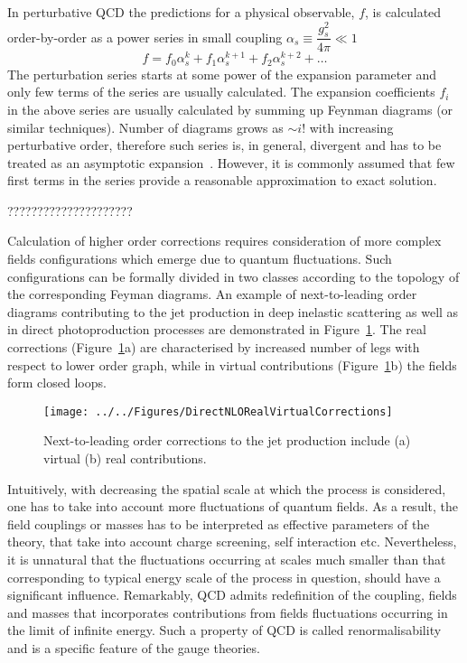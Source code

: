 In perturbative QCD the predictions for a physical observable, $f$, is calculated order-by-order as a power series in small coupling $\alpha_s \equiv \dfrac{g_s^2}{4\pi} \ll 1$
\begin{equation}
   f=f_{0}\alpha^{k}_s + f_{1}\alpha^{k+1}_s + f_{2}\alpha^{k+2}_s + \ldots
	 \label{eq:pertseries}
\end{equation}
The perturbation series starts at some power of the expansion parameter and only few terms of the series are usually calculated. The expansion coefficients $f_i$ in the above series are usually calculated by summing up Feynman diagrams (or similar techniques). Number of diagrams grows as $\sim i!$ with increasing perturbative order, therefore such series is, in general, divergent and has to be treated as an asymptotic expansion~\cite{lipatovQCD}. However, it is commonly assumed that few first terms in the series provide a reasonable approximation to exact solution. 

?????????????????????

Calculation of higher order corrections requires consideration of more complex fields configurations which emerge due to quantum fluctuations. Such configurations can be formally divided in two classes according to the topology of the corresponding Feyman diagrams. An example of next-to-leading order diagrams contributing to the jet production in deep inelastic scattering as well as in direct photoproduction processes are demonstrated in Figure~\ref{fig:nlojetfeyn}. The real corrections (Figure~\ref{fig:nlojetfeyn}a) are characterised by increased number of legs with respect to lower order graph, while in virtual contributions (Figure~\ref{fig:nlojetfeyn}b) the fields form closed loops.
 
\begin{figure}[h]
 \texttt{[image: ../../Figures/DirectNLORealVirtualCorrections]}
\caption{Next-to-leading order corrections to the jet production include (a) virtual (b) real contributions.}
\label{fig:nlojetfeyn}
\end{figure}

Intuitively, with decreasing the spatial scale at which the process is considered, one has to take into account more fluctuations of quantum fields. As a result, the field couplings or masses has to be interpreted as effective parameters of the theory, that take into account charge screening, self interaction etc. Nevertheless, it is unnatural that the fluctuations occurring at scales much smaller than that corresponding to typical energy scale of the process in question, should have a significant influence. Remarkably, QCD admits redefinition of the coupling, fields and masses that incorporates contributions from fields fluctuations occurring in the limit of infinite energy. Such a property of QCD is called renormalisability and is a specific feature of the gauge theories. 

